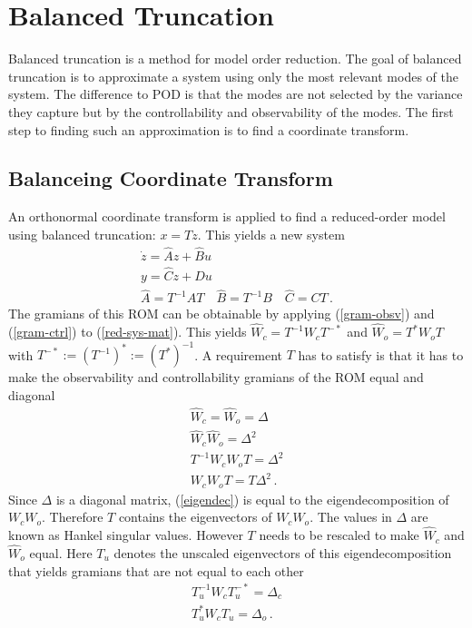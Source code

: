 \section{Balanced Truncation} \label{bt}
Balanced truncation is a method for model order reduction.
The goal of balanced truncation is to approximate a system using only the most relevant modes of the system.
The difference to POD is that the modes are not selected by the variance they capture but by the controllability and observability of the modes.
The first step to finding such an approximation is to find a coordinate transform.
\subsection{Balanceing Coordinate Transform} \label{balre}
An orthonormal coordinate transform is applied to find a reduced-order model using balanced truncation: \(x = Tz\).
This yields a new system
\begin{gather}
\dot{z} = \hat{A}z + \hat{B}u \label{z1}\\
y = \hat{C}z + Du \label{z2} \\
\hat{A} = T^{-1}AT \quad \hat{B} = T^{-1}B \quad \hat{C} = CT \,.\label{red-sys-mat}
\end{gather}
The gramians of this ROM can be obtainable by applying  (\ref{gram-obsv}) and (\ref{gram-ctrl}) to (\ref{red-sys-mat}).
This yields \(\hat{W}_c = T^{-1}W_cT^{-*}\) and \(\hat{W}_o = T^{*}W_oT\) with  \(T^{-*} := (T^{-1})^{*} := (T^{*})^{-1}\).
A requirement \(T\) has to satisfy is that it has to make the observability and controllability gramians of the ROM equal and diagonal
\begin{gather}
\hat{W}_c = \hat{W}_o = \Delta \\
\hat{W}_c \hat{W}_o = \Delta^{2} \\
T^{-1}W_cW_oT = \Delta^{2} \\
W_cW_oT = T\Delta^{2}  \,. \label{eigendec}
\end{gather}
Since \(\Delta\) is a diagonal matrix, (\ref{eigendec}) is equal to the eigendecomposition of \(W_cW_o\).
Therefore \(T\) contains the eigenvectors of \(W_cW_o\).
The values in \(\Delta\) are known as Hankel singular values.
However \(T\) needs to be rescaled to make \(\hat{W}_c\) and \(\hat{W}_o\) equal.
Here \(T_u\) denotes the unscaled eigenvectors of this eigendecomposition that yields gramians that are not equal to each other
\begin{gather}
T_u^{-1}W_cT_u^{-*} = \Delta_c \label{e1}\\
T_u^{*}W_cT_u = \Delta_o  \,. \label{e2}
\end{gather}
